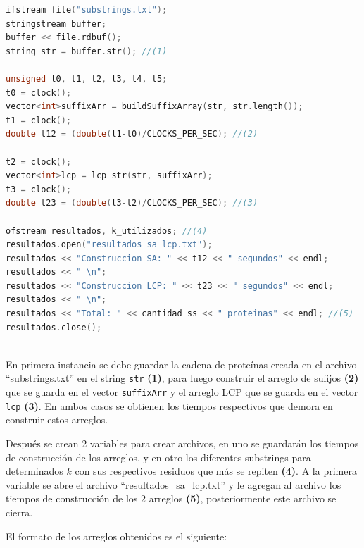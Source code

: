 \begin{lstlisting}[language=C++, caption=Obtención de los arreglos SA y LCP para la cadena de proteínas]
ifstream file("substrings.txt");
stringstream buffer;
buffer << file.rdbuf();
string str = buffer.str(); //(1)

unsigned t0, t1, t2, t3, t4, t5;
t0 = clock();
vector<int>suffixArr = buildSuffixArray(str, str.length());
t1 = clock();
double t12 = (double(t1-t0)/CLOCKS_PER_SEC); //(2)

t2 = clock();
vector<int>lcp = lcp_str(str, suffixArr);
t3 = clock();
double t23 = (double(t3-t2)/CLOCKS_PER_SEC); //(3)

ofstream resultados, k_utilizados; //(4)
resultados.open("resultados_sa_lcp.txt");
resultados << "Construccion SA: " << t12 << " segundos" << endl;
resultados << " \n";
resultados << "Construccion LCP: " << t23 << " segundos" << endl;
resultados << " \n";
resultados << "Total: " << cantidad_ss << " proteinas" << endl; //(5)
resultados.close();
	
\end{lstlisting}

En primera instancia se debe guardar la cadena de proteínas creada en el archivo ``substrings.txt'' en el string \texttt{str} \textbf{(1)}, para luego construir el arreglo de sufijos \textbf{(2)} que se guarda en el vector \texttt{suffixArr} y el arreglo LCP que se guarda en el vector \texttt{lcp} \textbf{(3)}. En ambos casos se obtienen los tiempos respectivos que demora en construir estos arreglos.

Después se crean 2 variables para crear archivos, en uno se guardarán los tiempos de construcción de los arreglos, y en otro los diferentes substrings para determinados $k$ con sus respectivos residuos que más se repiten \textbf{(4)}. A la primera variable se abre el archivo ``resultados\_sa\_lcp.txt'' y le agregan al archivo los tiempos de construcción de los 2 arreglos \textbf{(5)}, posteriormente este archivo se cierra.

El formato de los arreglos obtenidos es el siguiente:

